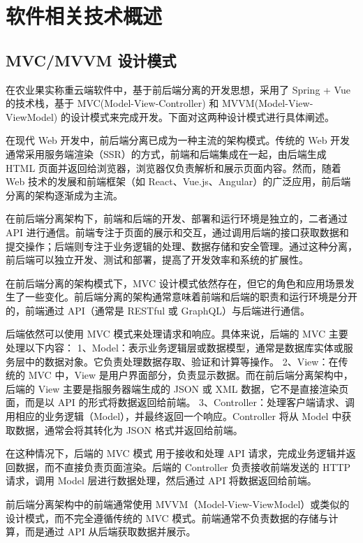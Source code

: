 \chapter{软件相关技术概述}

\section{MVC/MVVM 设计模式}

在农业果实称重云端软件中，基于前后端分离的开发思想，采用了 Spring + Vue 的技术栈，基于 MVC(Model-View-Controller) 和 MVVM(Model-View-ViewModel) 的设计模式来完成开发。下面对这两种设计模式进行具体阐述。

在现代 Web 开发中，前后端分离已成为一种主流的架构模式。传统的 Web 开发通常采用服务端渲染（SSR）的方式，前端和后端集成在一起，由后端生成 HTML 页面并返回给浏览器，浏览器仅负责解析和展示页面内容。然而，随着 Web 技术的发展和前端框架（如 React、Vue.js、Angular）的广泛应用，前后端分离的架构逐渐成为主流。

在前后端分离架构下，前端和后端的开发、部署和运行环境是独立的，二者通过 API 进行通信。前端专注于页面的展示和交互，通过调用后端的接口获取数据和提交操作；后端则专注于业务逻辑的处理、数据存储和安全管理。通过这种分离，前后端可以独立开发、测试和部署，提高了开发效率和系统的扩展性。

在前后端分离的架构模式下，MVC 设计模式依然存在，但它的角色和应用场景发生了一些变化。前后端分离的架构通常意味着前端和后端的职责和运行环境是分开的，前端通过 API（通常是 RESTful 或 GraphQL）与后端进行通信。

后端依然可以使用 MVC 模式来处理请求和响应。具体来说，后端的 MVC 主要处理以下内容：
1、Model：表示业务逻辑层或数据模型，通常是数据库实体或服务层中的数据对象。它负责处理数据存取、验证和计算等操作。
2、View：在传统的 MVC 中，View 是用户界面部分，负责显示数据。而在前后端分离架构中，后端的 View 主要是指服务器端生成的 JSON 或 XML 数据，它不是直接渲染页面，而是以 API 的形式将数据返回给前端。
3、Controller：处理客户端请求、调用相应的业务逻辑（Model），并最终返回一个响应。Controller 将从 Model 中获取数据，通常会将其转化为 JSON 格式并返回给前端。

在这种情况下，后端的 MVC 模式 用于接收和处理 API 请求，完成业务逻辑并返回数据，而不直接负责页面渲染。后端的 Controller 负责接收前端发送的 HTTP 请求，调用 Model 层进行数据处理，然后通过 API 将数据返回给前端。

前后端分离架构中的前端通常使用 MVVM（Model-View-ViewModel）或类似的设计模式，而不完全遵循传统的 MVC 模式。前端通常不负责数据的存储与计算，而是通过 API 从后端获取数据并展示。

